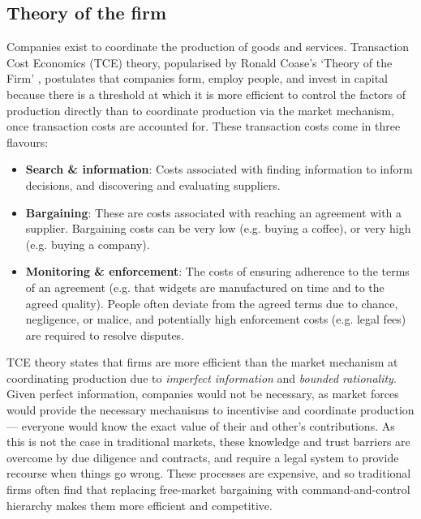 \subsection{Theory of the firm}

Companies exist to coordinate the production of goods and services. Transaction Cost Economics (TCE) theory, popularised by Ronald Coase’s `Theory of the Firm' \cite{The-Nature-of-the-Firm}, postulates that companies form, employ people, and invest in capital because there is a threshold at which it is more efficient to control the factors of production directly than to coordinate production via the market mechanism, once transaction costs are accounted for. These transaction costs come in three flavours:

\begin{itemize}
	\item \textbf{Search \& information}: Costs associated with finding information to inform decisions, and discovering and evaluating suppliers. 
	\item \textbf{Bargaining}: These are costs associated with reaching an agreement with a supplier. Bargaining costs can be very low (e.g. buying a coffee), or very high (e.g. buying a company).
	\item \textbf{Monitoring \& enforcement}: The costs of ensuring adherence to the terms of an agreement (e.g. that widgets are manufactured on time and to the agreed quality). People often deviate from the agreed terms due to chance, negligence, or malice, and potentially high enforcement costs (e.g. legal fees) are required to resolve disputes.
\end{itemize}

TCE theory states that firms are more efficient than the market mechanism at coordinating production due to \textit{imperfect information} and \textit{bounded rationality}. Given perfect information, companies would not be necessary, as market forces would provide the necessary mechanisms to incentivise and coordinate production --- everyone would know the exact value of their and other’s contributions. As this is not the case in traditional markets, these knowledge and trust barriers are overcome by due diligence and contracts, and require a legal system to provide recourse when things go wrong. These processes are expensive, and so traditional firms often find that replacing free-market bargaining with command-and-control hierarchy makes them more efficient and competitive.

